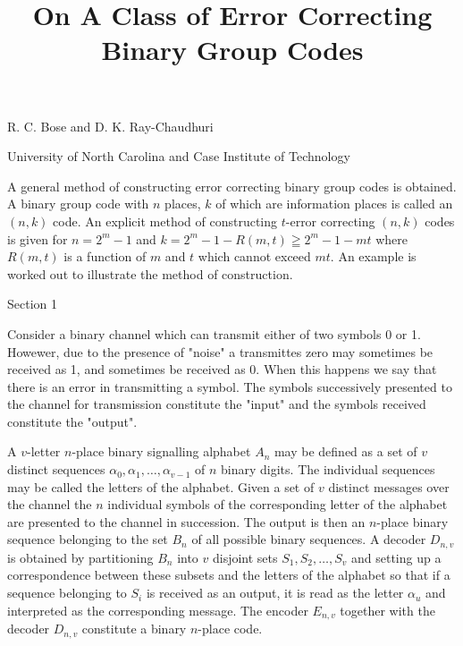 \documentclass{article}
\title{On A Class of Error Correcting Binary Group Codes}
\date{}
\begin{document}
\maketitle
R. C. Bose and D. K. Ray-Chaudhuri

University of North Carolina and Case Institute of Technology

A general method of constructing error correcting binary group codes is obtained. A binary group code with $n$ places, $ k$ of which are information places is called an $(n,k)$ code. An explicit method of constructing $t$-error correcting $(n,k)$ codes is given for $n=2^m-1$ and $k=2^m-1-R(m,t) \geqq 2^m-1-mt$ where $R(m,t)$ is a function of $m$ and $t$ which cannot exceed $mt$. An example is worked out to illustrate the method of construction.

Section 1

Consider a binary channel which can transmit either of two symbols 0 or 1. Howewer, due to the presence of "noise" a transmittes zero may sometimes be received as 1, and sometimes be received as 0. When this happens we say that there is an error in transmitting a symbol. The symbols successively presented to the channel for transmission constitute the "input" and the symbols received constitute the "output".

A $v$-letter $n$-place binary signalling alphabet $A_n$ may be defined as a set of $v$ distinct sequences $\alpha_0,\alpha_1, \dots, \alpha_{v-1}$ of $n$ binary digits. The individual sequences may be called the letters of the alphabet. Given a set of $v$ distinct messages over the channel the $n$ individual symbols of the corresponding letter of the alphabet are presented to the channel in succession. The output is then an $n$-place binary sequence belonging to the set $B_n$ of all possible binary sequences. A decoder $D_{n,v}$ is obtained by partitioning $B_n$ into $v$ disjoint sets $S_1, S_2, \dots, S_v$ and setting up a correspondence between these subsets and the letters of the alphabet so that if a sequence belonging to $S_i$ is received as an output, it is read as the letter $\alpha_u$ and interpreted as the corresponding message. The encoder $E_{n,v}$ together with the decoder $D_{n,v}$ constitute a binary $n$-place code.
\end{document}
